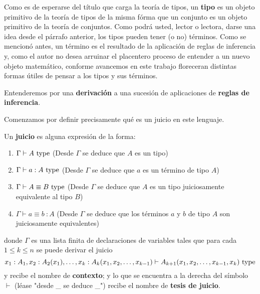 \documentclass{article}
\begin{document}
        Como es de esperarse del título que carga la teoría de tipos, un \textbf{tipo} es un objeto primitivo de la teoría de tipos de la misma fórma que un conjunto
        es un objeto primitivo de la teoría de conjuntos. Como podrá usted, lector o lectora, darse una idea desde el párrafo anterior, los tipos pueden tener (o no)
        términos. Como se mencionó antes, un término es el resultado de la aplicación de reglas de inferencia y, como el autor no desea arruinar el placentero proceso
        de entender a un nuevo objeto matemático, conforme avancemos en este trabajo floreceran distintas formas útiles de pensar a los tipos y sus términos.

        Entenderemos por una \textbf{derivación} a una sucesión de aplicaciones de \textbf{reglas de inferencia}.

        Comenzamos por definir precisamente qué es un juicio en este lenguaje.
        \begin{definition}
            Un \textbf{juicio} es alguna expresión de la forma:
            \begin{enumerate}
                \item $\Gamma \vdash A\ \mathrm{type}$ (Desde $\Gamma$ se deduce que $A$ es un tipo)
                \item $\Gamma \vdash a : A\ \mathrm{type}$ (Desde $\Gamma$ se deduce que $a$ es un término de tipo $A$)
                \item $\Gamma \vdash A \equiv B\ \type$ (Desde $\Gamma$ se deduce que $A$ es un tipo juiciosamente equivalente al tipo $B$)
                \item $\Gamma \vdash a \equiv b\ : A$ (Desde $\Gamma$ se deduce que los términos $a$ y $b$ de tipo $A$ son juiciosamente equivalentes)
            \end{enumerate}

            donde $\Gamma$ es una lista finita de declaraciones de variables tales que para cada $1 \leq k \leq n$
            se puede derivar el juicio
            $$
                x_1 : A_1, x_2 : A_2(x_1), \dots, x_k : A_k(x_1, x_2, \dots, x_{k-1}) \vdash A_{k+1}(x_1, x_2, \dots, x_{k-1}, x_k)\ \mathrm{type}
            $$
            y recibe el nombre de \textbf{contexto}; y lo que se encuentra a la derecha del símbolo $\vdash$ 
            (léase "desde \_ se deduce \_") recibe el nombre de \textbf{tesis de juicio}.
        \end{definition}
\end{document}
